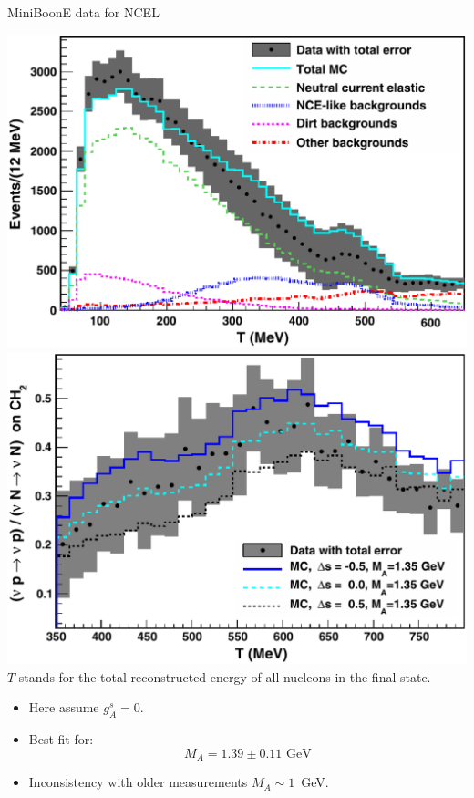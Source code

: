 \begin{slide}[toc=MiniBooNE data]{MiniBoonE data for NCEL}
{  }
  {
    \twocolumn
    {
      \includegraphics[width = \columnwidth]{img/mbnce1.eps}
    }
    {
      \includegraphics[width = \columnwidth]{img/mbnce2.eps}  
    }
    \vspace{10pt}
    {\centering\color{pdcolor4}\footnotesize $T$ stands for the total reconstructed energy of all nucleons in the final state.\\}
    \vspace{10pt}
    \twocolumn
    {
      \begin{itemize}
      
      \item Here assume $g_A^s = 0$.
      
      \item Best fit for: $$M_A = 1.39 \pm 0.11\mbox{~GeV}$$
      
      \vspace{-10pt}\item Inconsistency with older measurements $M_A \sim 1$~GeV.
      

\end{itemize}}}
\end{slide}
